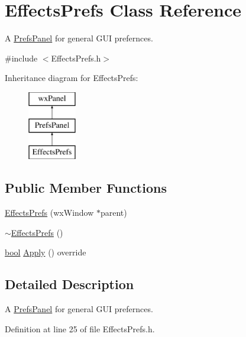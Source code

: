 \hypertarget{class_effects_prefs}{}\section{Effects\+Prefs Class Reference}
\label{class_effects_prefs}


A \hyperlink{class_prefs_panel}{Prefs\+Panel} for general G\+UI prefernces.  




{\ttfamily \#include $<$Effects\+Prefs.\+h$>$}

Inheritance diagram for Effects\+Prefs\+:\begin{figure}[H]
\begin{center}
\leavevmode
\includegraphics[height=3.000000cm]{class_effects_prefs}
\end{center}
\end{figure}
\subsection*{Public Member Functions}
\begin{DoxyCompactItemize}
\item 
\hyperlink{class_effects_prefs_a80b55a1d8967bf823eb0a9820af4c0de}{Effects\+Prefs} (wx\+Window $\ast$parent)
\item 
\hyperlink{class_effects_prefs_a589ffbd7092e2d3d4e005306353300e2}{$\sim$\+Effects\+Prefs} ()
\item 
\hyperlink{mac_2config_2i386_2lib-src_2libsoxr_2soxr-config_8h_abb452686968e48b67397da5f97445f5b}{bool} \hyperlink{class_effects_prefs_aa65bf9586fd6503e0b28f3d612b20ceb}{Apply} () override
\end{DoxyCompactItemize}


\subsection{Detailed Description}
A \hyperlink{class_prefs_panel}{Prefs\+Panel} for general G\+UI prefernces. 

Definition at line 25 of file Effects\+Prefs.\+h.



